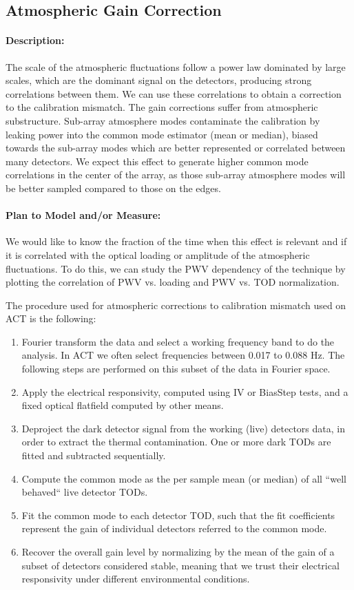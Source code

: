 \subsection{Atmospheric Gain Correction}

\paragraph{Description:}
The scale of the atmospheric fluctuations follow a power law dominated by large scales, which are the dominant signal on the detectors, producing strong correlations between them. We can use these correlations to obtain a correction to the calibration mismatch. The gain corrections suffer from atmospheric substructure. Sub-array atmosphere modes contaminate the calibration by leaking power into the common mode estimator (mean or median), biased towards the sub-array modes which are better represented or correlated between many detectors. We expect this effect to generate higher common mode correlations in the center of the array, as those sub-array atmosphere modes will be better sampled compared to those on the edges.

\paragraph{Plan to Model and/or Measure:}
We would like to know the fraction of the time when this effect is relevant and if it is correlated with the optical loading or amplitude of the atmospheric fluctuations. To do this, we can study the PWV dependency of the technique by plotting the correlation of PWV vs. loading and PWV vs. TOD normalization.

The procedure used for atmospheric corrections to calibration mismatch used on ACT is the following:

\begin{enumerate}
\item Fourier transform the data and select a working frequency band to do the analysis. In ACT we often select frequencies between 0.017 to 0.088 Hz. The following steps are performed on this subset of the data in Fourier space.
\item Apply the electrical responsivity, computed using IV or BiasStep tests, and a fixed optical flatfield computed by other means.
\item Deproject the dark detector signal from the working (live) detectors data, in order to extract the thermal contamination. One or more dark TODs are fitted and subtracted sequentially.
\item Compute the common mode as the per sample mean (or median) of all ``well behaved`` live detector TODs.
\item Fit the common mode to each detector TOD, such that the fit coefficients represent the gain of individual detectors referred to the common mode.
\item Recover the overall gain level by normalizing by the mean of the gain of a subset of detectors considered stable, meaning that we trust their electrical responsivity under different environmental conditions.
\end{enumerate}

